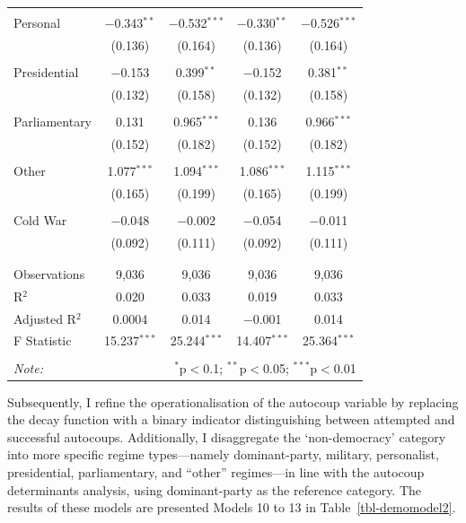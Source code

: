 \documentclass[
  12pt,
]{report}
\begin{document}
\begin{table}
{\begin{tabular}{@{\extracolsep{20pt}}lcccc}
  & & & & \\ 
 \hspace{1.5cm} Personal & $-$0.343$^{**}$ & $-$0.532$^{***}$ & $-$0.330$^{**}$ & $-$0.526$^{***}$ \\ 
  & (0.136) & (0.164) & (0.136) & (0.164) \\ 
  & & & & \\ 
 \hspace{1.5cm} Presidential & $-$0.153 & 0.399$^{**}$ & $-$0.152 & 0.381$^{**}$ \\ 
  & (0.132) & (0.158) & (0.132) & (0.158) \\ 
  & & & & \\ 
 \hspace{1.5cm} Parliamentary & 0.131 & 0.965$^{***}$ & 0.136 & 0.966$^{***}$ \\ 
  & (0.152) & (0.182) & (0.152) & (0.182) \\ 
  & & & & \\ 
 \hspace{1.5cm} Other & 1.077$^{***}$ & 1.094$^{***}$ & 1.086$^{***}$ & 1.115$^{***}$ \\ 
  & (0.165) & (0.199) & (0.165) & (0.199) \\ 
  & & & & \\ 
 Cold War & $-$0.048 & $-$0.002 & $-$0.054 & $-$0.011 \\ 
  & (0.092) & (0.111) & (0.092) & (0.111) \\ 
  & & & & \\ 
\hline \\[-1.8ex] 
Observations & 9,036 & 9,036 & 9,036 & 9,036 \\ 
R$^{2}$ & 0.020 & 0.033 & 0.019 & 0.033 \\ 
Adjusted R$^{2}$ & 0.0004 & 0.014 & $-$0.001 & 0.014 \\ 
F Statistic & 15.237$^{***}$ & 25.244$^{***}$ & 14.407$^{***}$ & 25.364$^{***}$ \\ 
\hline 
\hline \\[-1.8ex] 
\textit{Note:}  & \multicolumn{4}{r}{$^{*}$p$<$0.1; $^{**}$p$<$0.05; $^{***}$p$<$0.01} \\ 
\end{tabular}

}

\end{table}%

Subsequently, I refine the operationalisation of the autocoup variable
by replacing the decay function with a binary indicator distinguishing
between attempted and successful autocoups. Additionally, I disaggregate
the `non-democracy' category into more specific regime types---namely
dominant-party, military, personalist, presidential, parliamentary, and
``other'' regimes---in line with the autocoup determinants analysis,
using dominant-party as the reference category. The results of these
models are presented Models 10 to 13 in Table~\ref{tbl-demomodel2}.
\end{document}
